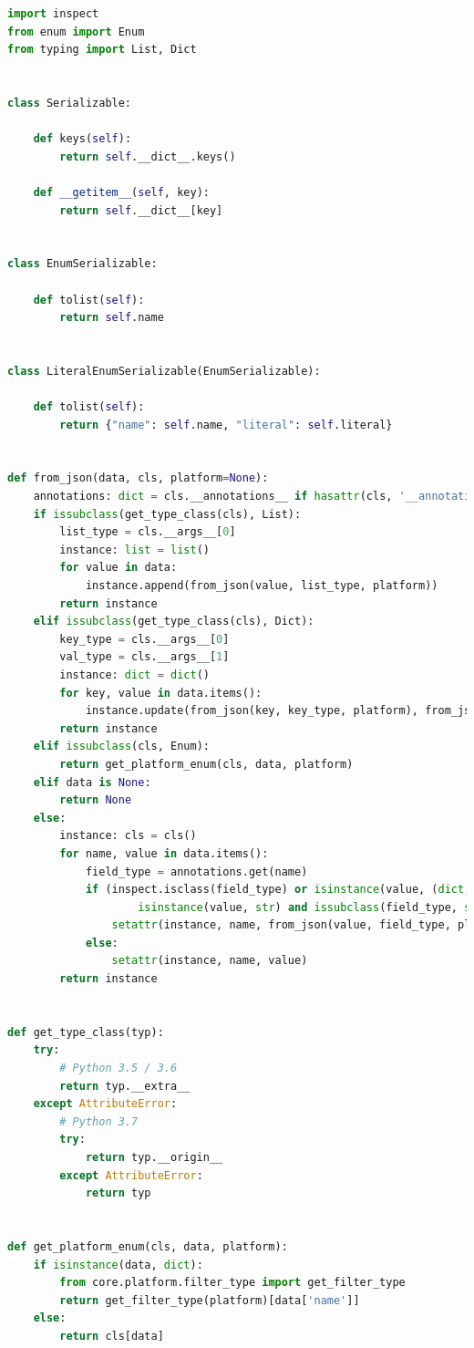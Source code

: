 \documentclass{article}
\begin{document}
\begin{lstlisting}[language=Python, caption=core.util.serializable]
import inspect
from enum import Enum
from typing import List, Dict


class Serializable:

    def keys(self):
        return self.__dict__.keys()

    def __getitem__(self, key):
        return self.__dict__[key]


class EnumSerializable:

    def tolist(self):
        return self.name


class LiteralEnumSerializable(EnumSerializable):

    def tolist(self):
        return {"name": self.name, "literal": self.literal}


def from_json(data, cls, platform=None):
    annotations: dict = cls.__annotations__ if hasattr(cls, '__annotations__') else None
    if issubclass(get_type_class(cls), List):
        list_type = cls.__args__[0]
        instance: list = list()
        for value in data:
            instance.append(from_json(value, list_type, platform))
        return instance
    elif issubclass(get_type_class(cls), Dict):
        key_type = cls.__args__[0]
        val_type = cls.__args__[1]
        instance: dict = dict()
        for key, value in data.items():
            instance.update(from_json(key, key_type, platform), from_json(value, val_type, platform))
        return instance
    elif issubclass(cls, Enum):
        return get_platform_enum(cls, data, platform)
    elif data is None:
        return None
    else:
        instance: cls = cls()
        for name, value in data.items():
            field_type = annotations.get(name)
            if (inspect.isclass(field_type) or isinstance(value, (dict, tuple, list, set, frozenset))) and not (
                    isinstance(value, str) and issubclass(field_type, str)):
                setattr(instance, name, from_json(value, field_type, platform))
            else:
                setattr(instance, name, value)
        return instance


def get_type_class(typ):
    try:
        # Python 3.5 / 3.6
        return typ.__extra__
    except AttributeError:
        # Python 3.7
        try:
            return typ.__origin__
        except AttributeError:
            return typ


def get_platform_enum(cls, data, platform):
    if isinstance(data, dict):
        from core.platform.filter_type import get_filter_type
        return get_filter_type(platform)[data['name']]
    else:
        return cls[data]
\end{lstlisting}
\end{document}
